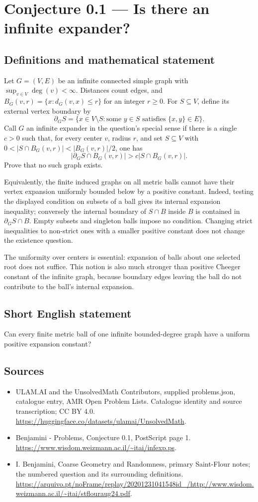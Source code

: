 \documentclass[11pt,a4paper]{article}
\begin{document}
\section*{Conjecture 0.1 — Is there an infinite expander?}\label{statement}

\subsection{Definitions and mathematical statement}
Let $G=(V,E)$ be an infinite connected simple graph with $\sup_{v\in V}\deg(v)<\infty$. Distances count edges, and $B_G(v,r)=\{x:d_G(v,x)\le r\}$ for an integer $r\ge0$. For $S\subseteq V$, define its external vertex boundary by
\[
\partial_G S=\{x\in V\setminus S:\text{some }y\in S\text{ satisfies }\{x,y\}\in E\}.
\]
Call $G$ an infinite expander in the question's special sense if there is a single $c>0$ such that, for every center $v$, radius $r$, and set $S\subseteq V$ with $0<|S\cap B_G(v,r)|<|B_G(v,r)|/2$, one has
\[
|\partial_G S\cap B_G(v,r)|>c|S\cap B_G(v,r)|.
\]
Prove that no such graph exists.

Equivalently, the finite induced graphs on all metric balls cannot have their vertex expansion uniformly bounded below by a positive constant. Indeed, testing the displayed condition on subsets of a ball gives its internal expansion inequality; conversely the internal boundary of $S\cap B$ inside $B$ is contained in $\partial_G S\cap B$. Empty subsets and singleton balls impose no condition. Changing strict inequalities to non-strict ones with a smaller positive constant does not change the existence question.

The uniformity over centers is essential: expansion of balls about one selected root does not suffice. This notion is also much stronger than positive Cheeger constant of the infinite graph, because boundary edges leaving the ball do not contribute to the ball's internal expansion.
\subsection{Short English statement}
Can every finite metric ball of one infinite bounded-degree graph have a uniform positive expansion constant?
\subsection{Sources}
\begin{itemize}
\item[S1] ULAM.AI and the UnsolvedMath Contributors, supplied problems.json, catalogue entry, AMR Open Problem Lists. Catalogue identity and source transcription; CC BY 4.0.
\url{https://huggingface.co/datasets/ulamai/UnsolvedMath}.
\item[S2] Benjamini - Problems, Conjecture 0.1, PostScript page 1. 
\url{https://www.wisdom.weizmann.ac.il/~itai/infexp.ps}.
\item[S3] I. Benjamini, Coarse Geometry and Randomness, primary Saint-Flour notes; the numbered question and its surrounding definitions.
\url{https://arquivo.pt/noFrame/replay/20201231041548id_/http://www.wisdom.weizmann.ac.il/~itai/stflouraug24.pdf}.
\end{itemize}
\end{document}
